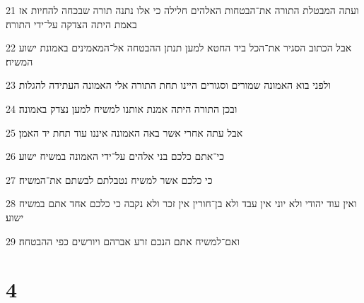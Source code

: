 \par 21 ועתה המבטלת התורה את־הבטחות האלהים חלילה כי אלו נתנה תורה שבכחה להחיות אז באמת היתה הצדקה על־ידי התורה׃
\par 22 אבל הכתוב הסגיר את־הכל ביד החטא למען תנתן ההבטחה אל־המאמינים באמונת ישוע המשיח׃
\par 23 ולפני בוא האמונה שמורים וסגורים היינו תחת התורה אלי האמונה העתידה להגלות׃
\par 24 ובכן התורה היתה אמנת אותנו למשיח למען נצדק באמונה׃
\par 25 אבל עתה אחרי אשר באה האמונה איננו עוד תחת יד האמן׃
\par 26 כי־אתם כלכם בני אלהים על־ידי האמונה במשיח ישוע׃
\par 27 כי כלכם אשר למשיח נטבלתם לבשתם את־המשיח׃
\par 28 ואין עוד יהודי ולא יוני אין עבד ולא בן־חורין אין זכר ולא נקבה כי כלכם אחד אתם במשיח ישוע׃
\par 29 ואם־למשיח אתם הנכם זרע אברהם ויורשים כפי ההבטחה׃

\chapter{4}

